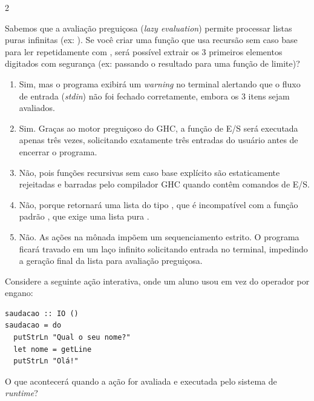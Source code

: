 \documentclass[a4paper,10pt,brazil]{article}
\begin{document}
\begin{multicols}{2}
\begin{enumerate}
\end{enumerate}

Sabemos que a avaliação preguiçosa (\emph{lazy evaluation}) permite processar listas puras infinitas (ex: ). 
Se você criar uma função  que usa recursão sem caso base para ler repetidamente com , será possível extrair os 3 primeiros elementos digitados com segurança (ex: passando o resultado para uma função de limite)?

\begin{enumerate}
  \item Sim, mas o programa exibirá um \emph{warning} no terminal alertando que o fluxo de entrada (\emph{stdin}) não foi fechado corretamente, embora os 3 itens sejam avaliados.

  \item Sim. Graças ao motor preguiçoso do GHC, a função de E/S será executada apenas três vezes, solicitando exatamente três entradas do usuário antes de encerrar o programa.

  \item Não, pois funções recursivas sem caso base explícito são estaticamente rejeitadas e barradas pelo compilador GHC quando contêm comandos de E/S.

  \item Não, porque  retornará uma lista do tipo \haskellinline{[IO String]}, que é incompatível com a função padrão , que exige uma lista pura \haskellinline{[a]}.

  \item Não. As ações na mônada  impõem um sequenciamento estrito. O programa ficará travado em um laço infinito solicitando entrada no terminal, impedindo a geração final da lista para avaliação preguiçosa.


\end{enumerate}

Considere a seguinte ação interativa, onde um aluno usou  em vez do operador \haskellinline{<-} por engano:

\begin{verbatim}
saudacao :: IO ()
saudacao = do
  putStrLn "Qual o seu nome?"
  let nome = getLine
  putStrLn "Olá!"
\end{verbatim}

O que acontecerá quando a ação  for avaliada e executada pelo sistema de \emph{runtime}?


\end{multicols}
\end{document}
